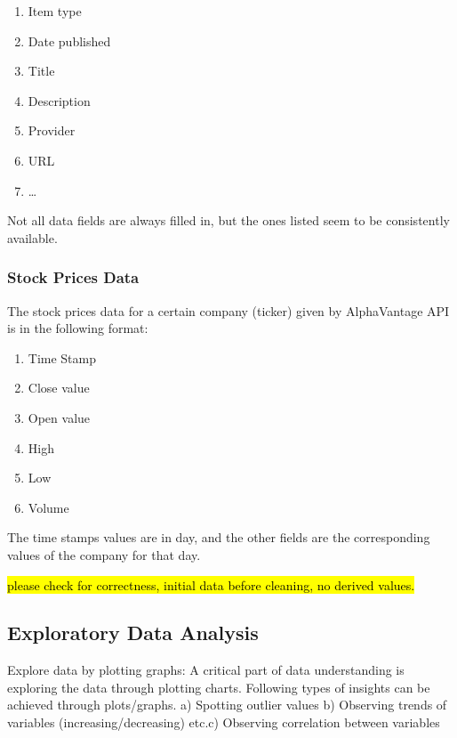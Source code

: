\documentclass[sigconf, nonacm]{acmart}
\begin{document}
\begin{enumerate}
    \item Item type
    \item Date published
    \item Title
    \item Description
    \item Provider
    \item URL
    \item \dots
\end{enumerate}

Not all data fields are always filled in, but the ones listed seem to be consistently available.

\subsubsection{Stock Prices Data}
The stock prices data for a certain company (ticker) given by AlphaVantage API is in the following format:

\begin{enumerate}
    \item Time Stamp
    \item Close value
    \item Open value
    \item High
    \item Low
    \item Volume
\end{enumerate}

The time stamps values are in day, and the other fields are the corresponding values of the company for that day.

\hl{please check for correctness, initial data before cleaning, no derived values.}

\subsection{Exploratory Data Analysis} %
Explore data by plotting graphs: A critical part of data understanding is exploring the data through plotting charts. Following types of insights can be achieved through plots/graphs. a) Spotting outlier values b)
Observing trends of variables (increasing/decreasing) etc.c) Observing correlation between variables
\end{document}

